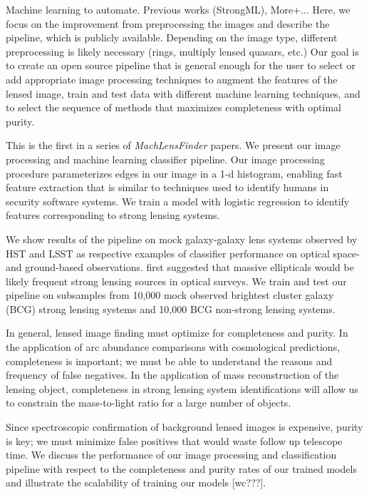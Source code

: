 \documentclass{emulateapj}
\begin{document}
Machine learning to automate.  Previous works (StrongML),
More+... Here, we focus on the improvement from preprocessing the
images and describe the pipeline, which is publicly available.
Depending on the image type, different preprocessing is likely
necessary (rings, multiply lensed quasars, etc.) Our goal is to create
an open source pipeline that is general enough for the user to select
or add appropriate image processing techniques to augment the features
of the lensed image, train and test data with different machine
learning techniques, and to select the sequence of methods that
maximizes completeness with optimal purity.

This is the first in a series of {\em MachLensFinder} papers.  We
present our image processing and machine learning classifier pipeline.
Our image processing procedure parameterizes edges in our image in a
1-d histogram, enabling fast feature extraction that is similar to
techniques used to identify humans in security software systems.  We
train a model with logistic regression to identify features
corresponding to strong lensing systems.

We show results of the pipeline on mock galaxy-galaxy lens systems
observed by HST and LSST as respective examples of classifier
performance on optical space- and ground-based observations.
\citet{miraldaescudeandlehar_92} first suggested that massive
ellipticals would be likely frequent strong lensing sources in optical
surveys.  We train and test our pipeline on subsamples from 10,000
mock observed brightest cluster galaxy (BCG) strong lensing systems
and 10,000 BCG non-strong lensing systems.

In general, lensed image finding must optimize for completeness and
purity.  In the application of arc abundance comparisons with
cosmological predictions, completeness is important; we must be able
to understand the reasons and frequency of false negatives.  In the
application of mass reconstruction of the lensing object, completeness
in strong lensing system identifications will allow us to constrain
the mass-to-light ratio for a large number of objects.  

Since spectroscopic confirmation of background lensed images is
expensive, purity is key; we must minimize false positives that would
waste follow up telescope time.  We discuss the performance of our
image processing and classification pipeline with respect to the
completeness and purity rates of our trained models and illustrate the
scalability of training our models [wc???].  
\end{document}
